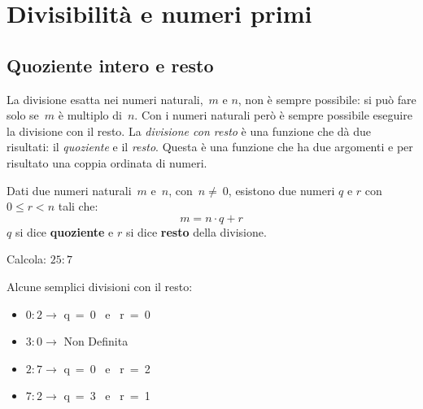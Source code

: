 \section{Divisibilità e numeri primi}
\label{sec:nat_divsibilita}

\subsection{Quoziente intero e resto}

La divisione esatta nei numeri naturali,~\(m\) e
\(n\), non è sempre possibile: 
si può fare solo se~\(m\) è multiplo di~\(n\).
Con i numeri naturali però è sempre possibile eseguire la divisione con il 
resto. La \emph{divisione con resto} è una funzione che dà due risultati:
il \emph{quoziente} e il \emph{resto}. 
Questa è una funzione che ha due argomenti e per risultato una coppia 
ordinata di numeri.

\begin{definizione}{}{}
Dati due numeri naturali~\(m\) e~\(n\), con~\(n\neq~0\), 
esistono due numeri \(q\) e \(r\) con \(0 \leqslant r < n\) 
tali che: 
\[m = n \cdot q + r\] 
\(q\) si dice \textbf{quoziente} e \(r\) si dice \textbf{resto} della 
divisione.
\end{definizione}

\begin{esempio}{}{} 
Calcola: \(25:7\)

\end{esempio}

\begin{esempio}{}{}
Alcune semplici divisioni con il resto:
\vspace{-1em}
\begin{htmulticols}{2}
\begin{itemize} [leftmargin=0cm, itemindent=.5cm, noitemsep]
\item \(0 : 2 \rightarrow\) \quad q~=~0 ~e~ r~=~0
\item \(3 : 0 \rightarrow\) \quad Non Definita
\item \(2 : 7 \rightarrow\) \quad q~=~0 ~e~ r~=~2
\item \(7 : 2 \rightarrow\) \quad q~=~3 ~e~ r~=~1
\end{itemize}
\end{htmulticols}
\end{esempio}

